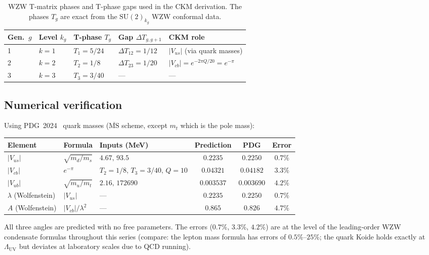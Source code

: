 \documentclass[11pt,a4paper]{article}
\theoremstyle{definition}
\theoremstyle{remark}
\newcommand{\LUV}{\Lambda_{\mathrm{UV}}}
\begin{document}
\begin{table}[h]
\centering
\renewcommand{\arraystretch}{1.35}
\caption{WZW T-matrix phases and T-phase gaps used in the CKM derivation.
The phases $T_g$ are exact from the $\mathrm{SU}(2)_{k_g}$ WZW conformal data.}
\label{P5:tab:wzw_data}
\begin{tabular}{lllll}
\toprule
Gen.\ $g$ & Level $k_g$ & T-phase $T_g$ & Gap $\Delta T_{g,g+1}$ & CKM role \\
\midrule
1 & $k=1$ & $T_1 = 5/24$ & $\Delta T_{12} = 1/12$ & $|V_{us}|$ (via quark masses) \\
2 & $k=2$ & $T_2 = 1/8$  & $\Delta T_{23} = 1/20$ & $|V_{cb}| = e^{-2\pi Q/20} = e^{-\pi}$ \\
3 & $k=3$ & $T_3 = 3/40$ & --- & --- \\
\bottomrule
\end{tabular}
\end{table}

\subsection{Numerical verification}
\label{P5:subsec:ckm_numerics}

Using PDG~2024~\cite{PDG2024} quark masses ($\overline{\mathrm{MS}}$ scheme,
except $m_t$ which is the pole mass):

\begin{center}
\renewcommand{\arraystretch}{1.5}
\begin{tabular}{lllccc}
\toprule
Element & Formula & Inputs (MeV) & Prediction & PDG & Error \\
\midrule
$|V_{us}|$ & $\sqrt{m_d/m_s}$ & $4.67,\,93.5$
  & $0.2235$ & $0.2250$ & $\mathbf{0.7\%}$ \\[2pt]
$|V_{cb}|$ & $e^{-\pi}$ & $T_2=1/8,\,T_3=3/40,\,Q=10$
  & $0.04321$ & $0.04182$ & $\mathbf{3.3\%}$ \\[2pt]
$|V_{ub}|$ & $\sqrt{m_u/m_t}$ & $2.16,\,172690$
  & $0.003537$ & $0.003690$ & $\mathbf{4.2\%}$ \\
\midrule
$\lambda$ (Wolfenstein) & $|V_{us}|$ & ---
  & $0.2235$ & $0.2250$ & $0.7\%$ \\
$A$ (Wolfenstein) & $|V_{cb}|/\lambda^2$ & ---
  & $0.865$ & $0.826$ & $4.7\%$ \\
\bottomrule
\end{tabular}
\end{center}

All three angles are predicted with no free parameters.
The errors ($0.7\%$, $3.3\%$, $4.2\%$) are at the level of the leading-order
WZW condensate formulas throughout this series (compare: the lepton mass
formula has errors of $0.5\%$--$25\%$; the quark Koide holds exactly
at $\LUV$ but deviates at laboratory scales due to QCD running).
\end{document}
